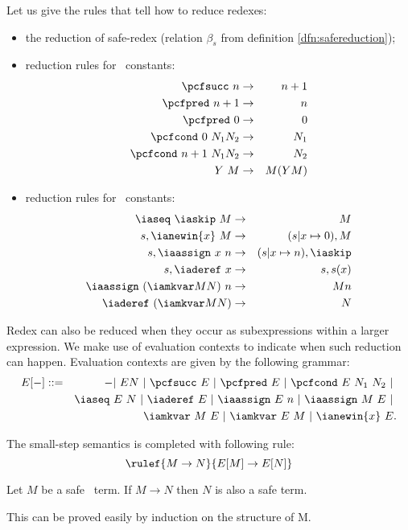Let us give the rules that tell how to reduce redexes:
\begin{itemize}
\item the reduction of safe-redex (relation $\beta_s$ from definition \ref{dfn:safereduction});
\item reduction rules for \pcf\ constants:
\begin{eqnarray*}
\pcfsucc\ n &\rightarrow& n+1 \\
\pcfpred\ n+1 &\rightarrow& n \\
\pcfpred\ 0 &\rightarrow& 0 \\
\pcfcond\ 0\ N_1 N_2 &\rightarrow& N_1 \\
\pcfcond\ n+1\ N_1 N_2 &\rightarrow& N_2 \\
Y\ M &\rightarrow& M (Y M)
\end{eqnarray*}
\item reduction rules for \ialgol\ constants:
\begin{eqnarray*}
\iaseq\ \iaskip\  M &\rightarrow& M \\
s, \ianewin{x}\ M &\rightarrow& (s|x\mapsto 0), M \\
s, \iaassign\ x\ n &\rightarrow& (s|x\mapsto n), \iaskip \\
s, \iaderef\ x &\rightarrow& s, s(x) \\
\iaassign\ (\iamkvar M N)\ n &\rightarrow& M n \\
\iaderef\ (\iamkvar M N) &\rightarrow& N
\end{eqnarray*}
\end{itemize}

Redex can also be reduced when they occur as subexpressions
within a larger expression. We make use of evaluation contexts to
indicate when such reduction can happen. Evaluation contexts are given by the following grammar:
\begin{eqnarray*}
E[-] &::=& - |\ E N\ |\ \pcfsucc\ E\ |\ \pcfpred\ E\ |\ \pcfcond\ E\ N_1\ N_2\ |\ \\
&&    \iaseq\ E\ N\ |\ \iaderef\ E\ |\ \iaassign\ E\ n\ |\ \iaassign\ M\ E \ |\ \\
&&    \iamkvar\ M\ E\ |\ \iamkvar\ E\ M\ |\ \ianewin{x}\ E  .
\end{eqnarray*}

The small-step semantics is completed with following rule:
$$ \rulef{M \rightarrow N}{E[M] \rightarrow E[N]} $$

\begin{lem}
\label{lem:ia_safety_preserved}
Let $M$ be a safe \ialgol\ term.
If $M \rightarrow N$ then $N$ is also a safe term.
\end{lem}
This can be proved easily by induction on the structure of M.


